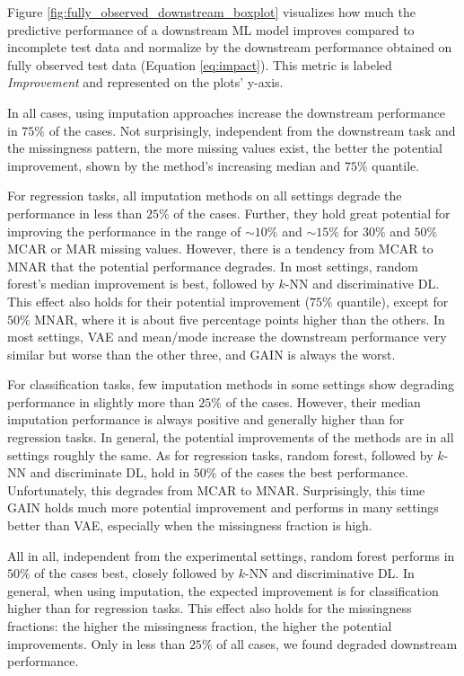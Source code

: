 Figure \ref{fig:fully_observed_downstream_boxplot} visualizes how much the predictive performance of a downstream ML model improves compared to incomplete test data and normalize by the downstream performance obtained on fully observed test data (Equation \ref{eq:impact}). This metric is labeled \textit{Improvement} and represented on the plots' y-axis.

In all cases, using imputation approaches increase the downstream performance in $75\%$ of the cases. Not surprisingly, independent from the downstream task and the missingness pattern, the more missing values exist, the better the potential improvement, shown by the method's increasing median and $75\%$ quantile.

For regression tasks, all imputation methods on all settings degrade the performance in less than $25\%$ of the cases. Further, they hold great potential for improving the performance in the range of $\sim10\%$ and $\sim15\%$ for $30\%$ and $50\%$ MCAR or MAR missing values. However, there is a tendency from MCAR to MNAR that the potential performance degrades. In most settings, random forest's median improvement is best, followed by $k$-NN and discriminative DL. This effect also holds for their potential improvement ($75\%$ quantile), except for $50\%$ MNAR, where it is about five percentage points higher than the others. In most settings, VAE and mean/mode increase the downstream performance very similar but worse than the other three, and GAIN is always the worst.

For classification tasks, few imputation methods in some settings show degrading performance in slightly more than $25\%$ of the cases. However, their median imputation performance is always positive and generally higher than for regression tasks. In general, the potential improvements of the methods are in all settings roughly the same. As for regression tasks, random forest, followed by $k$-NN and discriminate DL, hold in $50\%$ of the cases the best performance. Unfortunately, this degrades from MCAR to MNAR. Surprisingly, this time GAIN holds much more potential improvement and performs in many settings better than VAE, especially when the missingness fraction is high.

All in all, independent from the experimental settings, random forest performs in $50\%$ of the cases best, closely followed by $k$-NN and discriminative DL. In general, when using imputation, the expected improvement is for classification higher than for regression tasks. This effect also holds for the missingness fractions: the higher the missingness fraction, the higher the potential improvements. Only in less than $25\%$ of all cases, we found degraded downstream performance.


